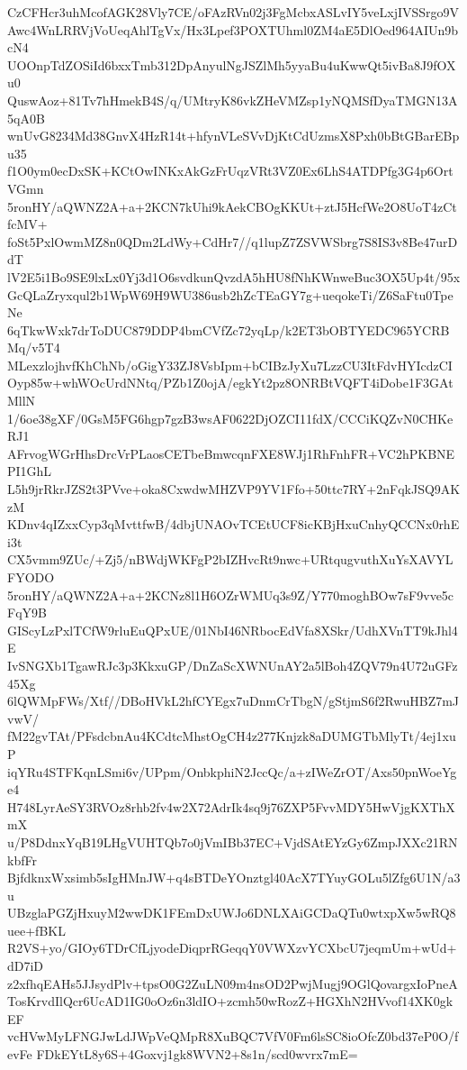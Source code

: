 CzCFHcr3uhMcofAGK28Vly7CE/oFAzRVn02j3FgMcbxASLvIY5veLxjIVSSrgo9V
Awc4WnLRRVjVoUeqAhlTgVx/Hx3Lpef3POXTUhml0ZM4aE5DlOed964AIUn9bcN4
UOOnpTdZOSiId6bxxTmb312DpAnyulNgJSZlMh5yyaBu4uKwwQt5ivBa8J9fOXu0
QuswAoz+81Tv7hHmekB4S/q/UMtryK86vkZHeVMZsp1yNQMSfDyaTMGN13A5qA0B
wnUvG8234Md38GnvX4HzR14t+hfynVLeSVvDjKtCdUzmsX8Pxh0bBtGBarEBpu35
f1O0ym0ecDxSK+KCtOwINKxAkGzFrUqzVRt3VZ0Ex6LhS4ATDPfg3G4p6OrtVGmn
5ronHY/aQWNZ2A+a+2KCN7kUhi9kAekCBOgKKUt+ztJ5HcfWe2O8UoT4zCtfcMV+
foSt5PxlOwmMZ8n0QDm2LdWy+CdHr7//q1lupZ7ZSVWSbrg7S8IS3v8Be47urDdT
lV2E5i1Bo9SE9lxLx0Yj3d1O6svdkunQvzdA5hHU8fNhKWnweBuc3OX5Up4t/95x
GcQLaZryxqul2b1WpW69H9WU386usb2hZcTEaGY7g+ueqokeTi/Z6SaFtu0TpeNe
6qTkwWxk7drToDUC879DDP4bmCVfZc72yqLp/k2ET3bOBTYEDC965YCRBMq/v5T4
MLexzlojhvfKhChNb/oGigY33ZJ8VsbIpm+bCIBzJyXu7LzzCU3ItFdvHYIcdzCI
Oyp85w+whWOcUrdNNtq/PZb1Z0ojA/egkYt2pz8ONRBtVQFT4iDobe1F3GAtMllN
1/6oe38gXF/0GsM5FG6hgp7gzB3wsAF0622DjOZCI11fdX/CCCiKQZvN0CHKeRJ1
AFrvogWGrHhsDrcVrPLaosCETbeBmwcqnFXE8WJj1RhFnhFR+VC2hPKBNEPI1GhL
L5h9jrRkrJZS2t3PVve+oka8CxwdwMHZVP9YV1Ffo+50ttc7RY+2nFqkJSQ9AKzM
KDnv4qIZxxCyp3qMvttfwB/4dbjUNAOvTCEtUCF8icKBjHxuCnhyQCCNx0rhEi3t
CX5vmm9ZUc/+Zj5/nBWdjWKFgP2bIZHvcRt9nwc+URtqugvuthXuYsXAVYLFYODO
5ronHY/aQWNZ2A+a+2KCNz8l1H6OZrWMUq3s9Z/Y770moghBOw7sF9vve5cFqY9B
GIScyLzPxlTCfW9rluEuQPxUE/01NbI46NRbocEdVfa8XSkr/UdhXVnTT9kJhl4E
IvSNGXb1TgawRJc3p3KkxuGP/DnZaScXWNUnAY2a5lBoh4ZQV79n4U72uGFz45Xg
6lQWMpFWs/Xtf//DBoHVkL2hfCYEgx7uDnmCrTbgN/gStjmS6f2RwuHBZ7mJvwV/
fM22gvTAt/PFsdcbnAu4KCdtcMhstOgCH4z277Knjzk8aDUMGTbMlyTt/4ej1xuP
iqYRu4STFKqnLSmi6v/UPpm/OnbkphiN2JccQc/a+zIWeZrOT/Axs50pnWoeYge4
H748LyrAeSY3RVOz8rhb2fv4w2X72AdrIk4sq9j76ZXP5FvvMDY5HwVjgKXThXmX
u/P8DdnxYqB19LHgVUHTQb7o0jVmIBb37EC+VjdSAtEYzGy6ZmpJXXc21RNkbfFr
BjfdknxWxsimb5sIgHMnJW+q4sBTDeYOnztgl40AcX7TYuyGOLu5lZfg6U1N/a3u
UBzglaPGZjHxuyM2wwDK1FEmDxUWJo6DNLXAiGCDaQTu0wtxpXw5wRQ8uee+fBKL
R2VS+yo/GIOy6TDrCfLjyodeDiqprRGeqqY0VWXzvYCXbcU7jeqmUm+wUd+dD7iD
z2xfhqEAHs5JJsydPlv+tpsO0G2ZuLN09m4nsOD2PwjMugj9OGlQovargxIoPneA
TosKrvdIlQcr6UcAD1IG0oOz6n3ldIO+zcmh50wRozZ+HGXhN2HVvof14XK0gkEF
vcHVwMyLFNGJwLdJWpVeQMpR8XuBQC7VfV0Fm6lsSC8ioOfcZ0bd37eP0O/fevFe
FDkEYtL8y6S+4Goxvj1gk8WVN2+8s1n/scd0wvrx7mE=

